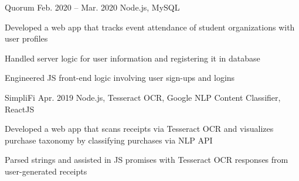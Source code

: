 \begin{cvprojects}
  \cvproject
  {Quorum}
  {\href{https://github.com/KevinIsMyName/Quorum}{\faGithubSquare\acvHeaderIconSep\@KevinIsMyName}}
  {Feb. 2020 -- Mar. 2020}
  {Node.js, MySQL}
  {
    \begin{cvitems}
      \item {Developed a web app that tracks event attendance of student organizations with user profiles}
      \item {Handled server logic for user information and registering it in database}
      \item {Engineered JS front-end logic involving user sign-ups and logins}
    \end{cvitems}
  }

  \cvproject
  {SimpliFi}
  {\href{https://github.com/unitehenry/simply-finance}{\faGithubSquare\acvHeaderIconSep{}}}
  {Apr. 2019}
  {Node.js, Tesseract OCR, Google NLP Content Classifier, ReactJS}
  {
    \begin{cvitems}
      \item {Developed a web app that scans receipts via Tesseract OCR and visualizes purchase taxonomy by classifying purchases via NLP API}
      \item {Parsed strings and assisted in JS promises with Tesseract OCR responses from user-generated receipts}
    \end{cvitems}
  }


\end{cvprojects}